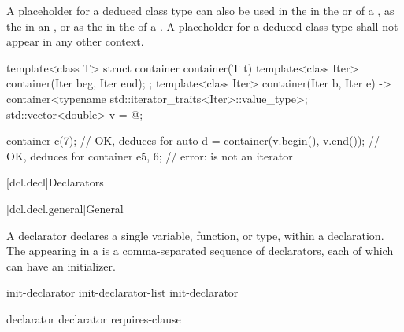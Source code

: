 \pnum
A placeholder for a deduced class type
can also be used
in the 
in the  or 
of a ,
as the 
in an ,
or
as the  in the 
of a .
A placeholder for a deduced class type
shall not appear in any other context.

\pnum
\begin{example}
\begin{codeblock}
template<class T> struct container {
    container(T t) {}
    template<class Iter> container(Iter beg, Iter end);
};
template<class Iter>
container(Iter b, Iter e) -> container<typename std::iterator_traits<Iter>::value_type>;
std::vector<double> v = { @\commentellip@ };

container c(7);                         // OK, deduces  for 
auto d = container(v.begin(), v.end()); // OK, deduces  for 
container e{5, 6};                      // error:  is not an iterator
\end{codeblock}
\end{example}
%

[dcl.decl]{Declarators}%

[dcl.decl.general]{General}%

%
%
%
%
%

\pnum
A declarator declares a single variable, function, or type, within a declaration.
The
appearing in a 
is a comma-separated sequence of declarators,
each of which can have an initializer.

\begin{bnf}
\br
    init-declarator\br
    init-declarator-list \terminal{,} init-declarator
\end{bnf}

\begin{bnf}
\br
    declarator \br
    declarator requires-clause
\end{bnf}


